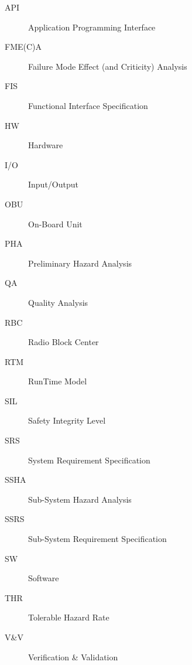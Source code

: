 \begin{description}
\item[API] Application Programming Interface
\item[FME(C)A] Failure Mode Effect (and Criticity) Analysis
\item[FIS] Functional Interface Specification
\item[HW] Hardware
\item[I/O] Input/Output
\item[OBU] On-Board Unit
\item[PHA] Preliminary Hazard Analysis
\item[QA] Quality Analysis
\item[RBC] Radio Block Center
\item[RTM] RunTime Model
\item[SIL] Safety Integrity Level
\item[SRS] System Requirement Specification
\item[SSHA] Sub-System Hazard Analysis
\item[SSRS] Sub-System Requirement Specification
\item[SW] Software
\item[THR] Tolerable Hazard Rate
\item[V\&V] Verification \& Validation
\end{description}
